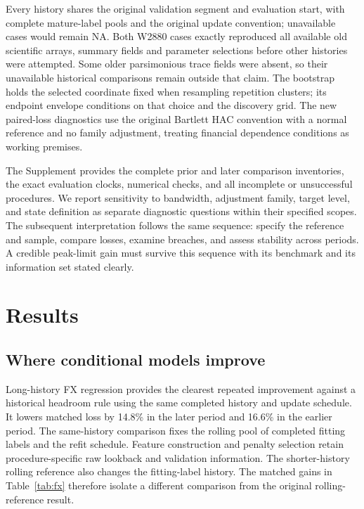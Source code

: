 \documentclass[11pt,a4paper]{article}
\begin{document}
Every history shares the original validation segment and evaluation start, with complete mature-label pools and the original update convention; unavailable cases would remain NA. Both W2880 cases exactly reproduced all available old scientific arrays, summary fields and parameter selections before other histories were attempted. Some older parsimonious trace fields were absent, so their unavailable historical comparisons remain outside that claim. The bootstrap holds the selected coordinate fixed when resampling repetition clusters; its endpoint envelope conditions on that choice and the discovery grid. The new paired-loss diagnostics use the original Bartlett HAC convention with a normal reference and no family adjustment, treating financial dependence conditions as working premises.

The Supplement provides the complete prior and later comparison inventories, the exact evaluation clocks, numerical checks, and all incomplete or unsuccessful procedures. We report sensitivity to bandwidth, adjustment family, target level, and state definition as separate diagnostic questions within their specified scopes. The subsequent interpretation follows the same sequence: specify the reference and sample, compare losses, examine breaches, and assess stability across periods. A credible peak-limit gain must survive this sequence with its benchmark and its information set stated clearly.


\FloatBarrier

\section{Results}\label{sec:results}

\subsection{Where conditional models improve}

Long-history FX regression provides the clearest repeated improvement against a historical headroom rule using the same completed history and update schedule. It lowers matched loss by 14.8\% in the later period and 16.6\% in the earlier period. The same-history comparison fixes the rolling pool of completed fitting labels and the refit schedule. Feature construction and penalty selection retain procedure-specific raw lookback and validation information. The shorter-history rolling reference also changes the fitting-label history. The matched gains in Table~\ref{tab:fx} therefore isolate a different comparison from the original rolling-reference result.
\end{document}

